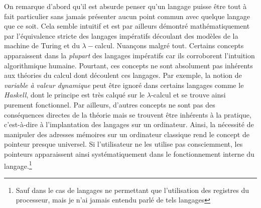 \documentclass[../../main.tex]{subfiles}
\begin{document}
On remarque d'abord qu'il est absurde penser qu'un langage puisse être tout à fait particulier sans jamais présenter aucun point commun avec quelque langage que ce soit. Cela semble intuitif et est par ailleurs démontré mathématiquement par l'équivalence stricte des langages impératifs découlant des modèles de la machine de Turing et du $\lambda-$calcul.\newline
Nuançons malgré tout. Certains concepts apparaissent dans la \textit{plupart} des langages impératifs car ils corroborent l'intuition algorithmique humaine. Pourtant, ces concepts ne sont absolument pas inhérents aux théories du calcul dont découlent ces langages. Par exemple, la notion de \textit{variable à valeur dynamique} peut être ignoré dans certains langages comme le \textit{Haskell}, dont le principe est très calqué sur le $\lambda$-calcul et se trouve ainsi purement fonctionnel. Par ailleurs, d'autres concepts ne sont pas des conséquences directes de la théorie mais se trouvent être inhérents à la pratique, c'est-à-dire à l'implantation des langages sur un ordinateur. Ainsi, la nécessité de manipuler des adresses mémoires sur un ordinateur classique rend le concept de pointeur presque universel. Si l'utilisateur ne les utilise pas consciemment, les pointeurs apparaissent ainsi systématiquement dans le fonctionnement interne du langage.\footnote{Sauf dans le cas de langages ne permettant que l'utilisation des registres du processeur, mais je n'ai jamais entendu parlé de tels langages}

\hrulefill
\newpage
\end{document}
